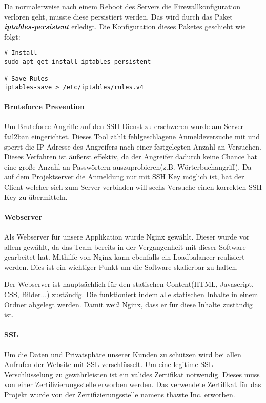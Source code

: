 Da normalerweise nach einem Reboot des Servers die Firewallkonfiguration verloren geht, musste diese persistiert werden. Das wird durch das Paket \textbf{\textit{iptables-persistent}} erledigt. Die Konfiguration dieses Paketes geschieht wie folgt\cite{FIREWALL_PERSISTENT}:

\begin{lstlisting}[caption = Installation iptables-persistent, label = firewall2]
# Install
sudo apt-get install iptables-persistent

# Save Rules
iptables-save > /etc/iptables/rules.v4
\end{lstlisting}

\paragraph{Bruteforce Prevention}
Um Bruteforce Angriffe auf den SSH Dienst zu erschweren wurde am Server fail2ban eingerichtet. Dieses Tool zählt fehlgeschlagene Anmeldeversuche mit und sperrt die IP Adresse des Angreifers nach einer festgelegten Anzahl an Versuchen. Dieses Verfahren ist äußerst effektiv, da der Angreifer dadurch keine Chance hat eine große Anzahl an Passwörtern auszuprobieren(z.B. Wörterbuchangriff). Da auf dem Projektserver die Anmeldung nur mit SSH Key möglich ist, hat der Client welcher sich zum Server verbinden will sechs Versuche einen korrekten SSH Key zu übermitteln.
\paragraph{Webserver}
Als Webserver für unsere Applikation wurde Nginx gewählt. Dieser wurde vor allem gewählt, da das Team bereits in der Vergangenheit mit dieser Software gearbeitet hat. Mithilfe von Nginx kann ebenfalls ein Loadbalancer realisiert werden. Dies ist ein wichtiger Punkt um die Software skalierbar zu halten. \\


Der Webserver ist hauptsächlich für den statischen Content(HTML, Javascript, CSS, Bilder...) zuständig. Die funktioniert indem alle statischen Inhalte in einem Ordner abgelegt werden. Damit weiß Nginx, dass er für diese Inhalte zuständig ist.

\paragraph{SSL}
Um die Daten und Privatsphäre unserer Kunden zu schützen wird bei allen Aufrufen der Website mit \gls{SSL} verschlüsselt. Um eine legitime SSL Verschlüsselung zu gewährleisten ist ein valides Zertifikat notwendig. Dieses muss von einer Zertifizierungsstelle erworben werden. Das verwendete Zertifikat für das Projekt wurde von der Zertifizierungsstelle namens thawte Inc. erworben. 

